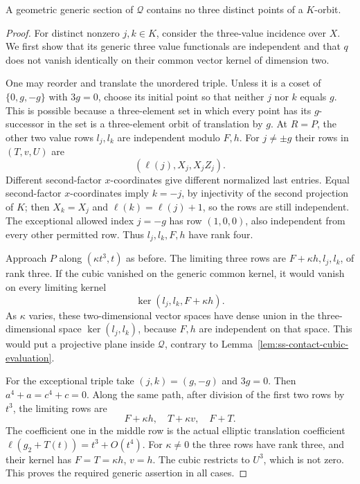 \begin{lemma}
\label{lem:ss-contact-no-triples}
A geometric generic section of $\mathcal Q$ contains no three
distinct points of a $K$-orbit.
\end{lemma}
\begin{proof}
For distinct nonzero $j,k\in K$, consider the three-value incidence
over $X$. We first show that its generic three value functionals
are independent and that $q$ does not vanish identically on their
common vector kernel of dimension two.

One may reorder and translate the unordered triple. Unless it is
a coset of $\{0,g,-g\}$ with $3g=0$, choose its initial point so
that neither $j$ nor $k$ equals $g$. This is possible because a
three-element set in which every point has its $g$-successor in the
set is a three-element orbit of translation by $g$.
At $R=P$, the other two value rows $l_j,l_k$ are independent modulo
$F,h$. For $j\ne\pm g$ their rows in $(T,v,U)$ are
\[
                        (\ell(j),X_j,X_jZ_j).
\]
Different second-factor $x$-coordinates give different normalized
last entries. Equal second-factor $x$-coordinates imply $k=-j$,
by injectivity of the second projection of $K$; then $X_k=X_j$
and $\ell(k)=\ell(j)+1$, so the rows are still independent.
The exceptional allowed index $j=-g$ has row $(1,0,0)$, also
independent from every other permitted row. Thus
$l_j,l_k,F,h$ have rank four.

Approach $P$ along $(\kappa t^3,t)$ as before. The limiting three
rows are $F+\kappa h,l_j,l_k$, of rank three. If the cubic vanished
on the generic common kernel, it would vanish on every limiting
kernel
\[
                    \ker(l_j,l_k,F+\kappa h).
\]
As $\kappa$ varies, these two-dimensional vector spaces have dense
union in the three-dimensional space $\ker(l_j,l_k)$, because
$F,h$ are independent on that space. This would put a projective
plane inside $\mathcal Q$, contrary to
Lemma~\ref{lem:ss-contact-cubic-evaluation}.

For the exceptional triple take $(j,k)=(g,-g)$ and $3g=0$.
Then $a^4+a=c^4+c=0$. Along the same path, after division of the
first two rows by $t^3$, the limiting rows are
\[
                      F+\kappa h,\quad T+\kappa v,\quad F+T.
\]
The coefficient one in the middle row is the actual elliptic
translation coefficient
$\ell(g_2+T(t))=t^3+O(t^4)$.
For $\kappa\ne0$ the three rows have rank three, and their kernel
has $F=T=\kappa h$, $v=h$. The cubic restricts to $U^3$, which
is not zero. This proves the required generic assertion in all cases.


\end{proof}
